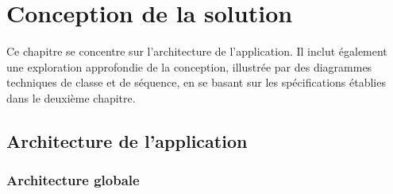 \chapter{Conception de la solution}
\label{Conception de la solution}

Ce chapitre se concentre sur l'architecture de l'application. Il inclut également une exploration approfondie de la conception, illustrée par des diagrammes techniques de classe et de séquence, en se basant sur les spécifications établies dans le deuxième chapitre.
\newpage

\section{Architecture de l'application}
\subsection{Architecture globale}

